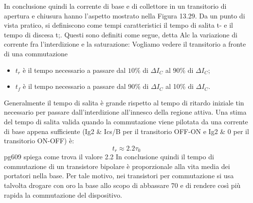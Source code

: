 %
In conclusione quindi la corrente di base e di collettore in un transitorio di apertura
e chiusura hanno l'aspetto mostrato nella Figura 13.29. Da un punto di vista
pratico, si definiscono come tempi caratteristici il tempo di salita t- e il tempo di
discesa t;. Questi sono definiti come segue, detta Alc la variazione di corrente
fra l'interdizione e la saturazione: 
Vogliamo vedere il transitorio a fronte di una commutazione
\begin{itemize}
    \item $t_r$ è il tempo necessario a passare dal $10\%$ di $\Delta I_C$ al $90\%$ di $\Delta I_C$;
    \item $t_f$ è il tempo necessario a passare dal 90\% di $\Delta I_C$ al 10\% di $\Delta I_C$. 
\end{itemize}
%
Generalmente il tempo di salita è grande rispetto al tempo di ritardo iniziale tin
necessario per passare dall'interdizione all'innesco della regione attiva. Una stima
del tempo di salita valida quando la commutazione viene pilotata da una corrente
di base appena sufficiente (Ig2 \& Ics/B per il transitorio OFF-ON e Ig2 \& 0 per
il transitorio ON-OFF) è: 
%
\begin{equation}
    t_r \approx 2.2 \tau_0
\end{equation}
pg609 spiega come trova il valore 2.2
%
In conclusione quindi il tempo di commutazione di un transistore bipolare
è proporzionale alla vita media dei portatori nella base. Per tale motivo, nei
transistori per commutazione si usa talvolta drogare con oro la base allo scopo di
abbassare 70 e di rendere così più rapida la commutazione del dispositivo. 

